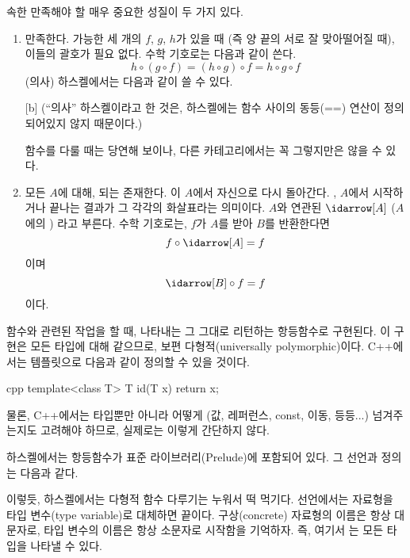  속한 \trComposition\이 만족해야 할 매우 중요한 성질이 두 가지 있다.

\begin{enumerate}
\item
\trComposition\은 \trAssociativity\을 만족한다. \trComposition 가능한 세 개의 \trMorphism $f$, $g$, $h$가 있을 때
(즉 양 끝의 \trObject\가 서로 잘 맞아떨어질 때), 이들의  괄호가 필요 없다.
수학 기호로는 다음과 같이 쓴다.
\[h \circ (g \circ f) = (h \circ g) \circ f = h \circ g \circ f\]
(의사) 하스켈에서는 다음과 같이 쓸 수 있다.

[b]
(``의사'' 하스켈이라고 한 것은, 하스켈에는 함수 사이의 동등(==) 연산이 정의되어있지 않지 때문이다.)

\trAssociativity\은 함수를 다룰 때는 당연해 보이나, 다른 카테고리에서는 꼭 그렇지만은 않을 수 있다.

\item
모든 \trObject $A$에 대해,  \trUnit\이 되는 \trArrow\가 존재한다.
이 \trArrow\는 $A$에서 자신으로 다시 돌아간다. 
 , $A$에서 시작하거나 끝나는   결과가 그 각각의 화살표라는 의미이다.
\trObject $A$와 연관된 \trUnit \trArrow\는 $\idarrow[A]$ ($A$에의 \newterm{\trIdentity}) 라고 부른다.
수학 기호로는, $f$가 $A$를 받아 $B$를 반환한다면
\[f \circ \idarrow[A] = f\]
이며
\[\idarrow[B] \circ f = f\]
이다.
\end{enumerate}
함수와 관련된 작업을 할 때, \trIdentity\을 나타내는 \trArrow\는 그 \trArgument\를 그대로 리턴하는 항등함수로 구현된다.
이 구현은 모든 타입에 대해 같으므로, 보편 다형적(universally polymorphic)이다. 
C++에서는 템플릿으로 다음과 같이 정의할 수 있을 것이다.

\begin{snip}{cpp}
template<class T> T id(T x) { return x; }
\end{snip}
물론, C++에서는  타입뿐만 아니라 어떻게 (값, 레퍼런스, const, 이동, 등등...) \trArgument\를 넘겨주는지도 고려해야 하므로,
실제로는 이렇게 간단하지 않다.

하스켈에서는 항등함수가 표준 라이브러리(Prelude)에 포함되어 있다. 
그 선언과 정의는 다음과 같다.

이렇듯, 하스켈에서는 다형적 함수 다루기는 누워서 떡 먹기다.
선언에서는 자료형을 타입 변수(type variable)로 대체하면 끝이다.
구상(concrete) 자료형의 이름은 항상 대문자로, 타입 변수의 이름은 항상 소문자로 시작함을 기억하자.
즉, 여기서 는 모든 타입을 나타낼 수 있다.

